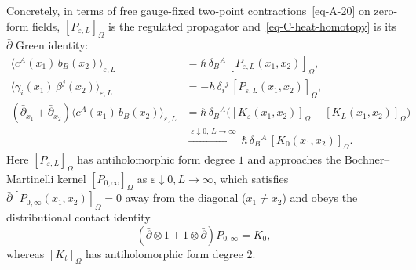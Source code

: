 \documentclass[11pt]{article}
\numberwithin{equation}{section}
\numberwithin{figure}{section}
\numberwithin{table}{section}
\begin{document}
Concretely, in terms of free gauge-fixed two-point contractions~\eqref{eq-A-20} on zero-form fields, $[P_{\varepsilon,L}]_\Omega$ is the regulated propagator and~\eqref{eq-C-heat-homotopy} is its $\bar\partial$ Green identity:
\begin{equation}\label{eq-C-free-two-point}
\begin{aligned}
\bigl\langle c^A(x_1)\,b_B(x_2)\bigr\rangle_{\varepsilon,L}
&=\hbar\,\delta_B{}^A\,[P_{\varepsilon,L}(x_1,x_2)]_\Omega,\\
\bigl\langle\gamma_i(x_1)\,\beta^j(x_2)\bigr\rangle_{\varepsilon,L}
&=-\hbar\,\delta_i{}^j\,[P_{\varepsilon,L}(x_1,x_2)]_\Omega,\\
(\bar\partial_{x_1}+\bar\partial_{x_2})\bigl\langle c^A(x_1)\,b_B(x_2)\bigr\rangle_{\varepsilon,L}
&=\hbar\,\delta_B{}^A\bigl([K_\varepsilon(x_1,x_2)]_\Omega-[K_L(x_1,x_2)]_\Omega\bigr)\\
&\xrightarrow{\;\varepsilon\downarrow0,\,L\to\infty\;}
\hbar\,\delta_B{}^A\,[K_0(x_1,x_2)]_\Omega.
\end{aligned}
\end{equation}
Here $[P_{\varepsilon,L}]_\Omega$ has antiholomorphic form degree $1$ and approaches the Bochner--Martinelli kernel $[P_{0,\infty}]_\Omega$ as $\varepsilon\downarrow0,L\to\infty$, which satisfies $\bar\partial[P_{0,\infty}(x_1,x_2)]_\Omega=0$ away from the diagonal ($x_1\ne x_2$) and obeys the distributional contact identity~\cite{Wang}
\begin{equation}\label{eq-C-contact-boundary}
(\bar\partial\otimes1+1\otimes\bar\partial)P_{0,\infty}=K_0,
\end{equation}
whereas $[K_t]_\Omega$ has antiholomorphic form degree $2$.
\end{document}
